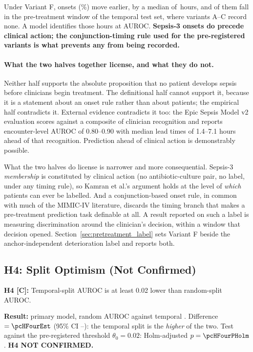 Under Variant F, \pcFNMovedEarlier{} onsets (\pcFPctMovedEarlier\%) move
earlier, by a median of \pcFMedianShiftH\,hours, and
\pcPreTreatOnsetsVarF{} of them fall in the pre-treatment window of the temporal
test set, where variants A--C record none. A model identifies those hours at
\pcPreTreatAurocPrimaryF{} AUROC. \textbf{Sepsis-3 onsets do precede clinical
action; the conjunction-timing rule used for the pre-registered variants is what
prevents any from being recorded.}

\paragraph{What the two halves together license, and what they do not.}
Neither half supports the absolute proposition that no patient develops sepsis
before clinicians begin treatment. The definitional half cannot support it,
because it is a statement about an onset rule rather than about patients; the
empirical half contradicts it. External evidence contradicts it too: the Epic
Sepsis Model v2 evaluation \cite{wong2026epic} scores against a composite of
clinician recognition and reports encounter-level AUROC of 0.80--0.90 with
median lead times of 1.4--7.1 hours ahead of that recognition. Prediction ahead
of clinical action is demonstrably possible.

What the two halves do license is narrower and more consequential. Sepsis-3
\emph{membership} is constituted by clinical action (no antibiotic-culture
pair, no label, under any timing rule), so Kamran et al.'s
\cite{kamran2024evaluation} argument holds at the level of \emph{which} patients
can ever be labelled. And a conjunction-based onset rule, in common with much of
the MIMIC-IV literature, discards the timing branch that makes a pre-treatment
prediction task definable at all. A result reported on such a label is measuring
discrimination around the clinician's decision, within a window that decision
opened.
Section~\ref{sec:pretreatment_label} sets Variant F beside the
anchor-independent deterioration label and reports both.

\subsection{H4: Split Optimism (Not Confirmed)}
\label{sec:h4_discussion}

\begin{mdframed}[backgroundcolor=ATUOrange!20, linecolor=ATUOrange]
    \textbf{H4 [C]:} Temporal-split AUROC is at least 0.02 lower than
    random-split AUROC.

    \textbf{Result:} primary model, random AUROC \pcAurocRandomPrimaryB{}
    against temporal \pcAurocPrimaryB. Difference $= \pcHFourEst$ (95\% CI
    \pcHFourCiLo--\pcHFourCiHi): the temporal split is the \emph{higher} of
    the two. Test against the pre-registered threshold $\theta_0 = 0.02$:
    Holm-adjusted $p = \pcHFourPHolm$. \textbf{H4 NOT CONFIRMED.}
\end{mdframed}

